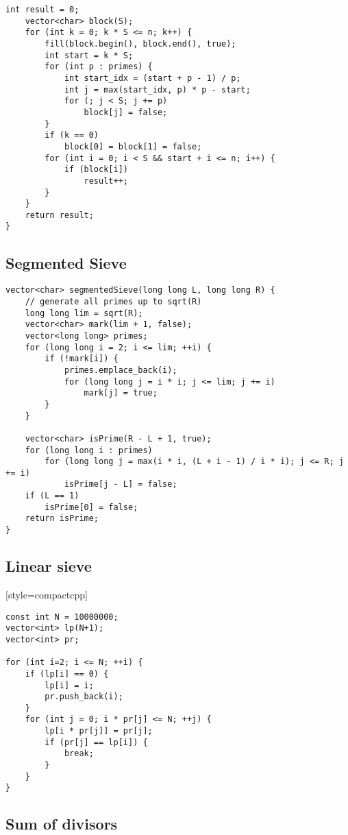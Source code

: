 \documentclass[10pt]{article}
\begin{document}
\begin{multicols*}{2}
\begin{lstlisting}[style=compactcpp]
    int result = 0;
    vector<char> block(S);
    for (int k = 0; k * S <= n; k++) {
        fill(block.begin(), block.end(), true);
        int start = k * S;
        for (int p : primes) {
            int start_idx = (start + p - 1) / p;
            int j = max(start_idx, p) * p - start;
            for (; j < S; j += p)
                block[j] = false;
        }
        if (k == 0)
            block[0] = block[1] = false;
        for (int i = 0; i < S && start + i <= n; i++) {
            if (block[i])
                result++;
        }
    }
    return result;
}

\end{lstlisting}
\subsection{Segmented Sieve}
\begin{lstlisting}[style=compactcpp]
vector<char> segmentedSieve(long long L, long long R) {
    // generate all primes up to sqrt(R)
    long long lim = sqrt(R);
    vector<char> mark(lim + 1, false);
    vector<long long> primes;
    for (long long i = 2; i <= lim; ++i) {
        if (!mark[i]) {
            primes.emplace_back(i);
            for (long long j = i * i; j <= lim; j += i)
                mark[j] = true;
        }
    }

    vector<char> isPrime(R - L + 1, true);
    for (long long i : primes)
        for (long long j = max(i * i, (L + i - 1) / i * i); j <= R; j += i)
            isPrime[j - L] = false;
    if (L == 1)
        isPrime[0] = false;
    return isPrime;
}
\end{lstlisting}
\subsection{Linear sieve}[style=compactcpp]
\begin{lstlisting}
const int N = 10000000;
vector<int> lp(N+1);
vector<int> pr;

for (int i=2; i <= N; ++i) {
    if (lp[i] == 0) {
        lp[i] = i;
        pr.push_back(i);
    }
    for (int j = 0; i * pr[j] <= N; ++j) {
        lp[i * pr[j]] = pr[j];
        if (pr[j] == lp[i]) {
            break;
        }
    }
}
\end{lstlisting}

\subsection{Sum of divisors}


\end{multicols*}
\end{document}
